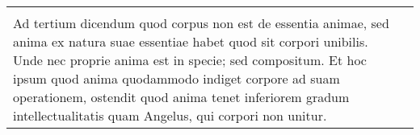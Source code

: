 \documentclass[10pt]{jsarticle} %
\begin{document}
\begin{longtable}{p{21em}p{21em}}
&

\\




Ad tertium dicendum quod corpus non est de essentia animae, sed anima
 ex natura suae essentiae habet quod sit corpori unibilis. Unde nec
 proprie anima est in specie; sed compositum. Et hoc ipsum quod anima
 quodammodo indiget corpore ad suam operationem, ostendit quod anima
 tenet inferiorem gradum intellectualitatis quam Angelus, qui corpori
 non unitur.

&





\end{longtable}
\end{document}
